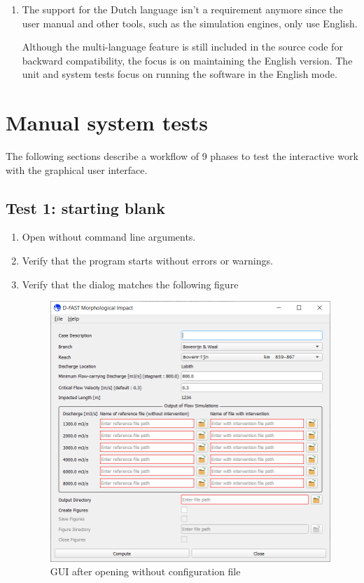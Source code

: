 \begin{enumerate}
\item \begin{requirement}
The support for the Dutch language isn’t a requirement anymore since the user manual and other tools, such as the simulation engines, only use English.
\end{requirement}
\begin{testmethod}
Although the multi-language feature is still included in the source code for backward compatibility, the focus is on maintaining the English version.
The unit and system tests focus on running the software in the English mode.
\end{testmethod}

\end{enumerate}

\section{Manual system tests} \label{Sec:GuiTests}
The following sections describe a workflow of 9 phases to test the interactive work with the graphical user interface.

\subsection{Test 1: starting blank}
\begin{enumerate}
\item Open \dfastmi without command line arguments.
\item Verify that the program starts without errors or warnings.
\item Verify that the dialog matches the following figure
\begin{figure}[H]
\center
\includegraphics[width=12cm]{figures/main_dialog.png}
\caption{GUI after opening without configuration file}
\label{fig:test1.png}
\end{figure}
\end{enumerate}

